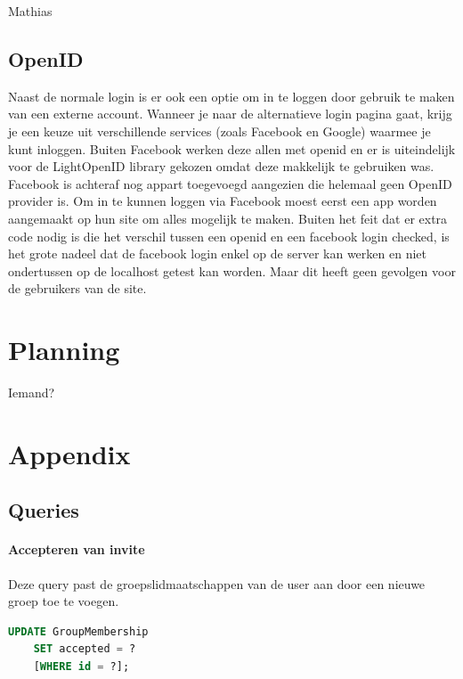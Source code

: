 \documentclass[11pt]{article}
\begin{document}
Mathias



\subsection{OpenID}

Naast de normale login is er ook een optie om in te loggen door gebruik te maken van een externe account. Wanneer je naar de alternatieve login pagina gaat, krijg je een keuze uit verschillende services (zoals Facebook en Google) waarmee je kunt inloggen. Buiten Facebook werken deze allen met openid en er is uiteindelijk voor de LightOpenID library gekozen omdat deze makkelijk te gebruiken was. Facebook is achteraf nog appart toegevoegd aangezien die helemaal geen OpenID provider is. Om in te kunnen loggen via Facebook moest eerst een app worden aangemaakt op hun site om alles mogelijk te maken. Buiten het feit dat er extra code nodig is die het verschil tussen een openid en een facebook login checked, is het grote nadeel dat de facebook login enkel op de server kan werken en niet ondertussen op de localhost getest kan worden. Maar dit heeft geen gevolgen voor de gebruikers van de site.




\section{Planning}


Iemand?



\section{Appendix}

\subsection{Queries}

\paragraph{Accepteren van invite}

  Deze query past de groepslidmaatschappen van de user aan door een nieuwe groep toe te voegen.

  \begin{framed}
  \begin{lstlisting}[language=sql]
    UPDATE GroupMembership
    SET accepted = ?
    [WHERE id = ?];
  \end{lstlisting}
  \end{framed}
\end{document}
